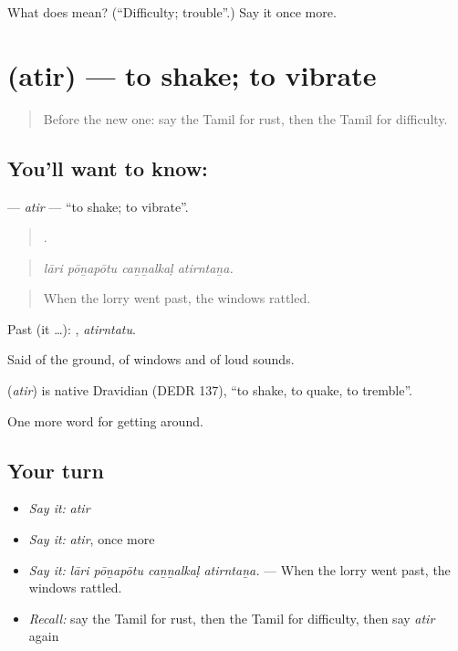 \begin{tcolorbox}[breakable,colback=teal!4,colframe=teal!35!black,title={Before you move on}]
What does  mean? (\textquotedblleft{}Difficulty; trouble\textquotedblright{}.) Say it once more.
\end{tcolorbox}
\section[\texorpdfstring{\ta{அதிர்} (atir)}{அதிர் (atir)}]{ (atir) — to shake; to vibrate}

\label{lesson:TA-C445-atir}



\begin{quote}
Before the new one: say the Tamil for rust, then the Tamil for difficulty.
\end{quote}

\subsection*{You'll want to know: }
\textbf{} — \emph{atir} — \textquotedblleft{}to shake; to vibrate\textquotedblright{}.

\begin{quote}
   .
\end{quote}

\begin{quote}
\emph{lāri pōṉapōtu caṉṉalkaḷ atirntaṉa.}
\end{quote}

\begin{quote}
When the lorry went past, the windows rattled.
\end{quote}

Past (it …): , \emph{atirntatu}.

Said of the ground, of windows and of loud sounds.

\begin{cousinweb}
\textbf{} (\emph{atir}) is native Dravidian (DEDR 137), \textquotedblleft{}to shake, to quake, to tremble\textquotedblright{}.
\end{cousinweb}

\begin{grammarlens}[title={What you've built}]
One more word for getting around.
\end{grammarlens}

\subsection*{Your turn}
\begin{itemize}
\raggedright
  \item \emph{Say it:} \emph{atir}
  \item \emph{Say it:} \emph{atir}, once more
  \item \emph{Say it:} \emph{lāri pōṉapōtu caṉṉalkaḷ atirntaṉa.} — When the lorry went past, the windows rattled.
  \item \emph{Recall:} say the Tamil for rust, then the Tamil for difficulty, then say \emph{atir} again
\end{itemize}

